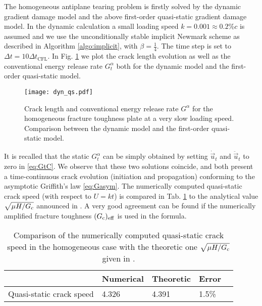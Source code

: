The homogeneous antiplane tearing problem is firstly solved by the dynamic gradient damage model and the above first-order quasi-static gradient damage model. In the dynamic calculation a small loading speed $k=0.001\approx 0.2\%c$ is assumed and we use the unconditionally stable implicit Newmark scheme as described in Algorithm \ref{algo:implicit}, with $\beta=\frac{1}{4}$. The time step is set to $\Delta t=10\Delta t_\mathrm{CFL}$. In Fig. \ref{fig:homoGcqs} we plot the crack length evolution as well as the conventional energy release rate $G^\alpha_t$ both for the dynamic model and the first-order quasi-static model.
\begin{figure}[htbp]
\centering
\texttt{[image: dyn\_qs.pdf]}
\caption{Crack length and conventional energy release rate $G^\alpha$ for the homogeneous fracture toughness plate at a very slow loading speed. Comparison between the dynamic model and the first-order quasi-static model.} \label{fig:homoGcqs}
\end{figure}
It is recalled that the static $G^\alpha_t$ can be simply obtained by setting $\dot{\vec{u}}_t$ and $\ddot{\vec{u}}_t$ to zero in \eqref{eq:GtC}. We observe that these two solutions coincide, and both present a time-continuous crack evolution (initiation and propagation) conforming to the asymptotic Griffith's law \eqref{eq:Gasym}. The numerically computed quasi-static crack speed (with respect to $U=kt$) is compared in Tab. \ref{tab:compqsv} to the analytical value $\sqrt{\mu H/G_\mathrm{c}}$ announced in \cite{BourdinFrancfortMarigo:2008}. A very good agreement can be found if the numerically amplified fracture toughness $(G_\mathrm{c})_\mathrm{eff}$ is used in the formula.
\begin{table}[htbp]
\caption{Comparison of the numerically computed quasi-static crack speed in the homogeneous case with the theoretic one $\sqrt{\mu H/G_\mathrm{c}}$ given in \cite{BourdinFrancfortMarigo:2008}.} \label{tab:compqsv}
\begin{tabular}{lllll} \toprule
& Numerical & Theoretic & Error \\ \midrule
Quasi-static crack speed & 4.326 & 4.391 & 1.5\% \\ \bottomrule
\end{tabular}
\end{table}

